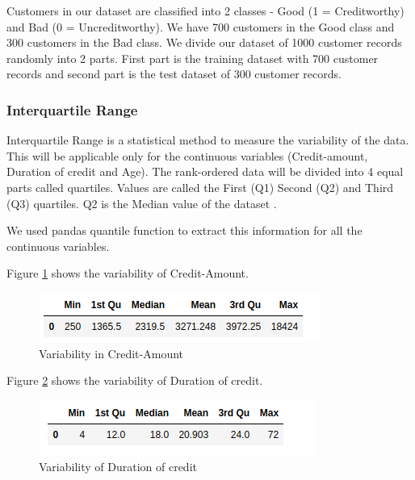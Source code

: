 \documentclass[sigconf]{acmart}
\begin{document}
Customers in our dataset are classified into 2 classes - Good (1 = Creditworthy) and Bad (0 = Uncreditworthy). We have 700 customers in the Good class and 300 customers in the Bad class. We divide our dataset of 1000 customer records randomly into 2 parts. First part is the training dataset with 700 customer records and second part is the test dataset of 300 customer records.


\subsubsection{Interquartile Range}

Interquartile Range is a statistical method to measure the variability of the data. This will be applicable only for the continuous variables (Credit-amount, Duration of credit and Age). The rank-ordered data will be divided into 4 equal parts called quartiles. Values are called the First (Q1) Second (Q2) and Third (Q3) quartiles. Q2 is the Median value of the dataset \cite{stat-trek-statistics}.

We used pandas quantile function to extract this information for all the continuous variables.

Figure \ref{fig:Figure15} shows the variability of Credit-Amount.

\begin{figure}[htb]
  \centering
  \includegraphics[width=1.0\columnwidth]{images/Figure15.png}
  \caption{Variability in Credit-Amount}
  \label{fig:Figure15} 
\end{figure}

Figure \ref{fig:Figure16} shows the variability of Duration of credit.

\begin{figure}[htb]
  \centering
  \includegraphics[width=1.0\columnwidth]{images/Figure16.png}
  \caption{Variability of Duration of credit}
  \label{fig:Figure16} 
\end{figure}
\end{document}
